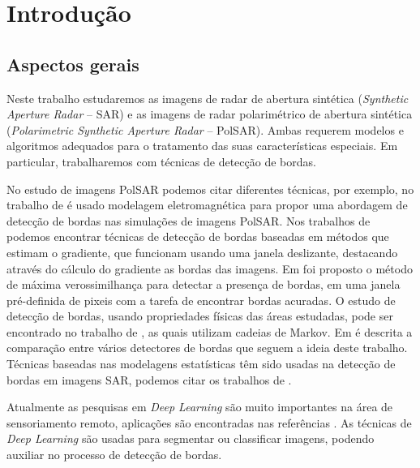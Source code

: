 \chapter{Introdução}
\label{cap_acf}

\section{Aspectos gerais}

Neste trabalho estudaremos as imagens de radar de abertura sintética (\textit{Synthetic Aperture Radar} -- SAR) e as imagens de radar polarimétrico de abertura sintética (\textit{Polarimetric Synthetic Aperture Radar} -- PolSAR).
Ambas requerem modelos e algoritmos adequados para o tratamento das suas características especiais.
Em particular, trabalharemos com técnicas de detecção de bordas.

No estudo de imagens PolSAR podemos citar diferentes técnicas, por exemplo, no trabalho de \citet{slf_2008} é usado modelagem eletromagnética para propor uma abordagem de detecção de bordas nas simulações de imagens PolSAR. 
Nos trabalhos de \citet{tlb, obw, flmc, fyf} podemos encontrar técnicas de detecção de bordas baseadas em métodos que estimam o gradiente, que funcionam usando uma janela deslizante, destacando através do cálculo do gradiente as bordas das imagens. 
Em \citet{obw} foi proposto o método de máxima verossimilhança para detectar a presença de bordas, em uma janela pré-definida de pixeis com a tarefa de encontrar bordas acuradas. 
O estudo de detecção de bordas, usando propriedades físicas das áreas estudadas, pode ser encontrado no trabalho de \citet{bf}, as quais utilizam cadeias de Markov. 
Em \citep{gfn} é descrita a comparação entre vários detectores de bordas que seguem a ideia deste trabalho. 
Técnicas baseadas nas modelagens estatísticas têm sido usadas na detecção de bordas em imagens SAR, podemos citar os trabalhos de \citet{gmbf, fbgm, horrit, gfn}. 

Atualmente as pesquisas em \textit{Deep Learning} são muito importantes na área de sensoriamento remoto, aplicações são encontradas nas referências \citep{bac, ztmxzxf, tabmm, xstz}. 
As técnicas de \textit{Deep Learning} são usadas para segmentar ou classificar imagens, podendo auxiliar no processo de detecção de bordas. 

